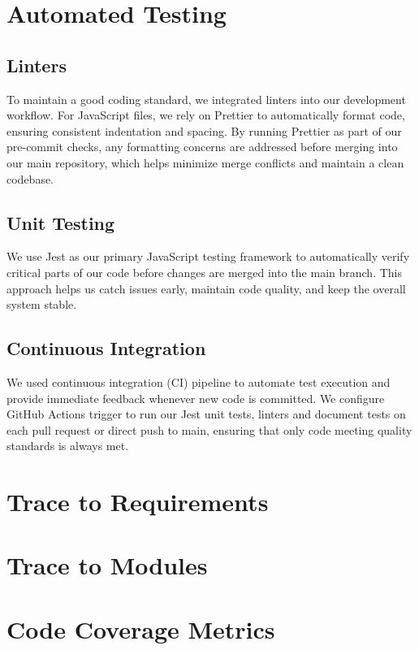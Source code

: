 \documentclass[12pt, titlepage]{article}
\begin{document}
\section{Automated Testing}

\subsection{Linters}
To maintain a good coding standard, we integrated linters into
our development workflow. For JavaScript files, we rely on Prettier to
automatically format code, ensuring consistent indentation and spacing.
By running Prettier as part of our pre-commit checks, any formatting concerns
are addressed before merging into our main repository, which helps minimize merge
conflicts and maintain a clean codebase.

\subsection{Unit Testing}
We use Jest as our primary JavaScript testing framework to automatically verify critical parts 
of our code before changes are merged into the main branch. This approach helps us catch issues 
early, maintain code quality, and keep the overall system stable.

\subsection{Continuous Integration}
We used continuous integration (CI) pipeline to automate test execution
and provide immediate feedback whenever new code is committed. We configure GitHub
Actions trigger to run our Jest unit tests, linters and document tests on each pull request 
or direct push to main, ensuring that only code meeting quality standards is always met.


		
\section{Trace to Requirements}
		
\section{Trace to Modules}		

\section{Code Coverage Metrics}
\end{document}

